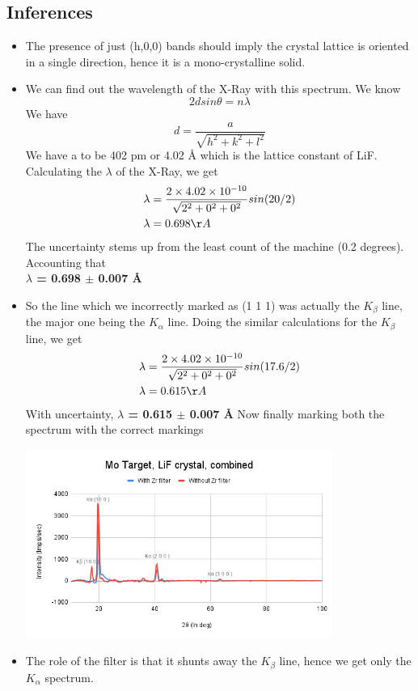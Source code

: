 \documentclass[]{report}[12 pt]
\begin{document}
\subsection*{Inferences}
\begin{itemize}
	\item The presence of just (h,0,0) bands should imply the crystal lattice is oriented in a single direction, hence it is a mono-crystalline solid.
	\item We can find out the wavelength of the X-Ray with this spectrum.
	We know\\
	\begin{equation*}
		2dsin\theta=n\lambda
	\end{equation*}
	We have 
	\[d=\frac{a}{\sqrt{h^2+k^2+l^2}}\]
	We have a to be 402 pm or 4.02 {\AA}  which is the lattice constant of LiF.
	Calculating the $\lambda$ of the X-Ray, we get
	\begin{align*}
		\lambda &= \frac{2\times4.02\times10^{-10}}{\sqrt{2^2+0^2+0^2}} sin(20/2)\\
		\lambda &= 0.698 {\AA}
	\end{align*}
	The uncertainty stems up from the least count of the machine (0.2 degrees). Accounting that\\
	\textbf{$\lambda$ = 0.698 $\pm$ 0.007 \AA}
	\item So the line which we incorrectly marked as (1 1 1) was actually the $K_{\beta}$ line, the major one being the $K_{\alpha}$ line. Doing the similar calculations for the $K_{\beta}$  line, we get
	\begin{align*}
		\lambda &= \frac{2\times4.02\times10^{-10}}{\sqrt{2^2+0^2+0^2}} sin(17.6/2)\\
		\lambda &= 0.615 {\AA}
	\end{align*}
	With uncertainty, \textbf{$\lambda$ = 0.615 $\pm$ 0.007 \AA}
	Now finally marking both the spectrum with the correct markings
	\begin{center}
		\includegraphics[width=10cm]{combm2.png}
	\end{center}
	\item The role of the filter is that it shunts away the $K_{\beta}$ line, hence we get only the $K_{\alpha} $ spectrum.
\end{itemize}
\end{document}
